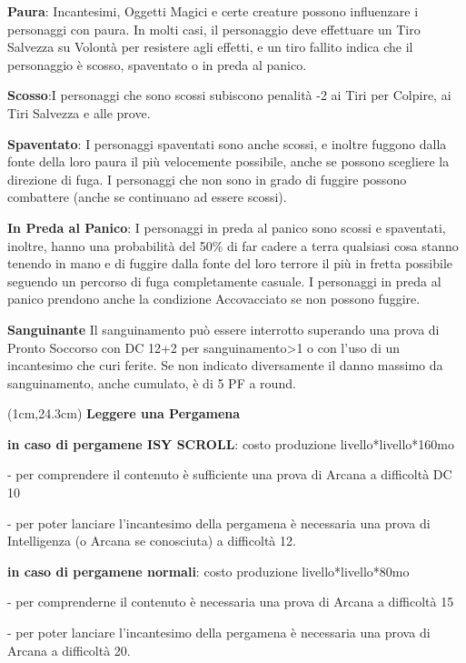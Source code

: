 \documentclass[a4paper,12 pt,openany]{book}
\begin{document}
\begin{textblock*}{19 cm}
\begin{multicols}{2}
\textbf{Paura}: Incantesimi, Oggetti Magici e certe creature possono influenzare i personaggi con paura. In molti casi, il personaggio deve effettuare un Tiro Salvezza su Volontà per resistere agli effetti, e un tiro fallito indica che il personaggio è scosso, spaventato o in preda al panico.

\textbf{Scosso}:I personaggi che sono scossi subiscono penalità -2 ai Tiri per Colpire, ai Tiri Salvezza e alle prove.

\textbf{Spaventato}: I personaggi spaventati sono anche scossi, e inoltre fuggono dalla fonte della loro paura il più velocemente possibile, anche se possono scegliere la direzione di fuga.
I personaggi che non sono in grado di fuggire possono combattere (anche se continuano ad essere scossi).

\textbf{In Preda al Panico}: I personaggi in preda al panico sono scossi e spaventati, inoltre, hanno una probabilità del 50\% di far cadere a terra qualsiasi cosa stanno tenendo in mano e di fuggire dalla fonte del loro terrore il più in fretta possibile seguendo un percorso di fuga completamente casuale.
I personaggi in preda al panico prendono anche la condizione Accovacciato se non possono fuggire.

\textbf{Sanguinante} Il sanguinamento può essere interrotto superando una prova di Pronto Soccorso con DC 12+2 per sanguinamento>1 o con l'uso di un incantesimo che curi ferite.
Se non indicato diversamente il danno massimo da sanguinamento, anche cumulato, è di 5 PF a round.
\end{multicols}

	\end{textblock*}


	\begin{textblock*}{19 cm}(1cm,24.3cm)
\textbf{Leggere una Pergamena}

\textbf{in caso di pergamene ISY SCROLL}: costo produzione livello*livello*160mo

- per comprendere il contenuto è sufficiente una prova di Arcana a difficoltà DC 10

- per poter lanciare l'incantesimo della pergamena è necessaria una prova di Intelligenza (o Arcana se conosciuta) a difficoltà 12.


\textbf{in caso di pergamene normali}: costo produzione livello*livello*80mo

- per comprenderne il contenuto è necessaria una prova di Arcana a difficoltà 15

- per poter lanciare l'incantesimo della pergamena è necessaria una prova di Arcana a difficoltà 20.
	\end{textblock*}
\end{document}
